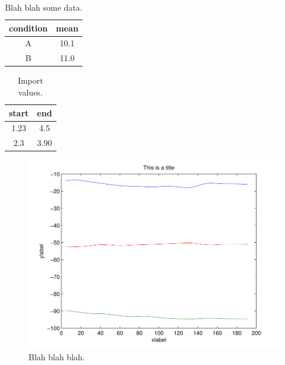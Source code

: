 \documentclass[letterpaper,11pt]{article}
\begin{document}
\newpage
\clearpage
\parbox[c][\textheight][s]{\linewidth}{%
\begin{table}[H]
	\centering
	\begin{tabular}{c|c}
		condition &mean\\
		\hline\hline
		A         &10.1\\
		B         &11.0\\
	\end{tabular}
 \caption{Blah blah some data.}
 \label{tbl:somedata}
\end{table}
}

\newpage
\clearpage
\parbox[c][\textheight][s]{\linewidth}{%
\begin{table}[H]
	\centering
	\begin{tabular}{c|c}
		start &end\\
		\hline\hline
		1.23         &4.5\\
		2.3         &3.90\\
	\end{tabular}
 \caption{Import values.}
 \label{tbl:someOtherData}
\end{table}
}
 

\newpage
\clearpage
\parbox[c][\textheight][s]{\linewidth}{%
\begin{figure}[H]
	\centering
    \includegraphics{./figures/fig1.pdf}
 \caption{Blah blah blah.}
 \label{fig:rawMU}
\end{figure}
}
\end{document}
